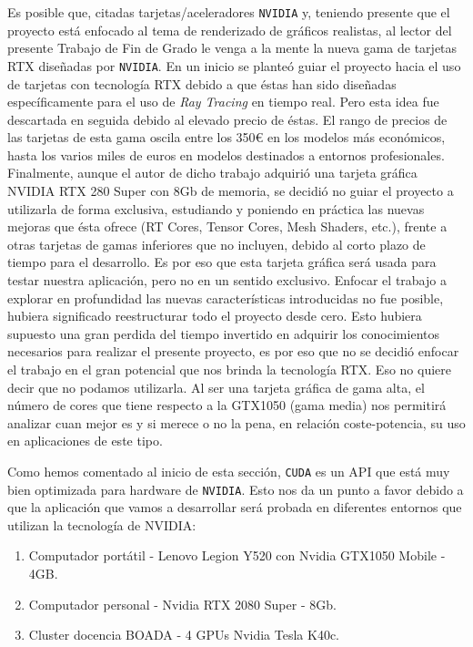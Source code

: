 \documentclass[titlepage,12pt]{article}
\begin{document}
Es posible que, citadas tarjetas/aceleradores \texttt{NVIDIA} y, teniendo presente que el proyecto está enfocado al tema de renderizado de gráficos realistas, al lector del presente Trabajo de Fin de Grado le venga a la mente la nueva gama de tarjetas RTX diseñadas por \texttt{NVIDIA}. En un inicio se planteó guiar el proyecto hacia el uso de tarjetas con tecnología RTX debido a que éstas han sido diseñadas específicamente para el uso de \textit{Ray Tracing} en tiempo real. Pero esta idea fue descartada en seguida debido al elevado precio de éstas. El rango de precios de las tarjetas de esta gama oscila entre los 350€ en los modelos más económicos, hasta los varios miles de euros en modelos destinados a entornos profesionales. Finalmente, aunque el autor de dicho trabajo adquirió una tarjeta gráfica NVIDIA RTX 280 Super con 8Gb de memoria, se decidió no guiar el proyecto a utilizarla de forma exclusiva, estudiando y poniendo en práctica las nuevas mejoras que ésta ofrece (RT Cores, Tensor Cores, Mesh Shaders, etc.), frente a otras tarjetas de gamas inferiores que no incluyen, debido al corto plazo de tiempo para el desarrollo. Es por eso que esta tarjeta gráfica será usada para testar nuestra aplicación, pero no en un sentido exclusivo. Enfocar el trabajo a explorar en profundidad las nuevas características introducidas no fue posible, hubiera significado reestructurar todo el proyecto desde cero. Esto hubiera supuesto una gran perdida del tiempo invertido en adquirir los conocimientos necesarios para realizar el presente proyecto, es por eso que no se decidió enfocar el trabajo en el gran potencial que nos brinda la tecnología RTX. Eso no quiere decir que no podamos utilizarla. Al ser una tarjeta gráfica de gama alta, el número de cores que tiene respecto a la GTX1050 (gama media) nos permitirá analizar cuan mejor es y si merece o no la pena, en relación coste-potencia, su uso en aplicaciones de este tipo.

Como hemos comentado al inicio de esta sección, \texttt{CUDA} es un API que está muy bien optimizada para hardware de \texttt{NVIDIA}. Esto nos da un punto a favor debido a que la aplicación que vamos a desarrollar será probada en diferentes entornos que utilizan la tecnología de NVIDIA:

\begin{enumerate}
	\item Computador portátil - Lenovo Legion Y520 con Nvidia GTX1050 Mobile - 4GB.
	\item Computador personal - Nvidia RTX 2080 Super - 8Gb.
	\item Cluster docencia BOADA - 4 GPUs Nvidia Tesla K40c.
\end{enumerate}
\end{document}
